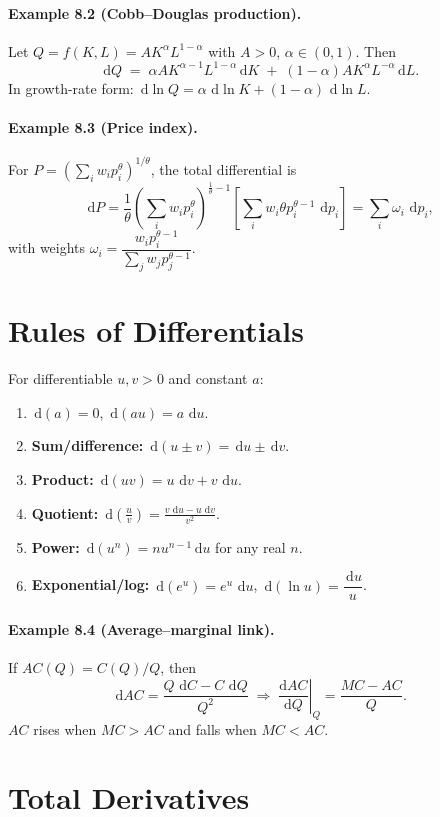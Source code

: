\documentclass[11pt]{article}
\newcommand{\dd}{\,\mathrm{d}}
\newcommand{\dtotal}[2]{\frac{\mathrm{d} #1}{\mathrm{d} #2}}
\newcommand{\brak}[1]{\left[#1\right]}
\newcommand{\paren}[1]{\left(#1\right)}
\begin{document}
\paragraph{Example 8.2 (Cobb--Douglas production).}
Let $Q=f(K,L)=A K^\alpha L^{1-\alpha}$ with $A>0$, $\alpha\in(0,1)$. Then
\[
\dd Q \;=\; \alpha A K^{\alpha-1}L^{1-\alpha}\dd K \;+\; (1-\alpha)A K^\alpha L^{-\alpha}\dd L.
\]
In growth-rate form: $\dd\ln Q = \alpha\,\dd\ln K + (1-\alpha)\,\dd\ln L$.

\paragraph{Example 8.3 (Price index).}
For $P=\paren{\sum_i w_i p_i^\theta}^{1/\theta}$, the total differential is
\[
\dd P = \frac{1}{\theta}\paren{\sum_i w_i p_i^\theta}^{\frac{1}{\theta}-1} 
\brak{\sum_i w_i \theta p_i^{\theta-1}\,\dd p_i}
= \sum_i \omega_i\,\dd p_i,
\]
with weights $\omega_i=\dfrac{w_i p_i^{\theta-1}}{\sum_j w_j p_j^{\theta-1}}$.

\section{Rules of Differentials}
For differentiable $u,v>0$ and constant $a$:
\begin{enumerate}[label=(\roman*)]
\item $\dd(a)=0$, \quad $\dd(au)=a\,\dd u$.
\item \textbf{Sum/difference:} $\dd(u\pm v)=\dd u\pm \dd v$.
\item \textbf{Product:} $\dd(uv)=u\,\dd v+v\,\dd u$.
\item \textbf{Quotient:} $\displaystyle \dd\!\paren{\frac{u}{v}}=\frac{v\,\dd u-u\,\dd v}{v^2}$.
\item \textbf{Power:} $\dd(u^n)=n u^{n-1}\dd u$ for any real $n$.
\item \textbf{Exponential/log:} $\dd(e^u)=e^u\,\dd u$, \quad $\dd(\ln u)=\dfrac{\dd u}{u}$.
\end{enumerate}

\paragraph{Example 8.4 (Average--marginal link).}
If $AC(Q)=C(Q)/Q$, then
\[
\dd AC = \frac{Q\,\dd C - C\,\dd Q}{Q^2}
\;\Rightarrow\;
\left.\dtotal{AC}{Q}\right|_{Q}=\frac{MC-AC}{Q}.
\]
$AC$ rises when $MC>AC$ and falls when $MC<AC$.

\section{Total Derivatives}
\end{document}
